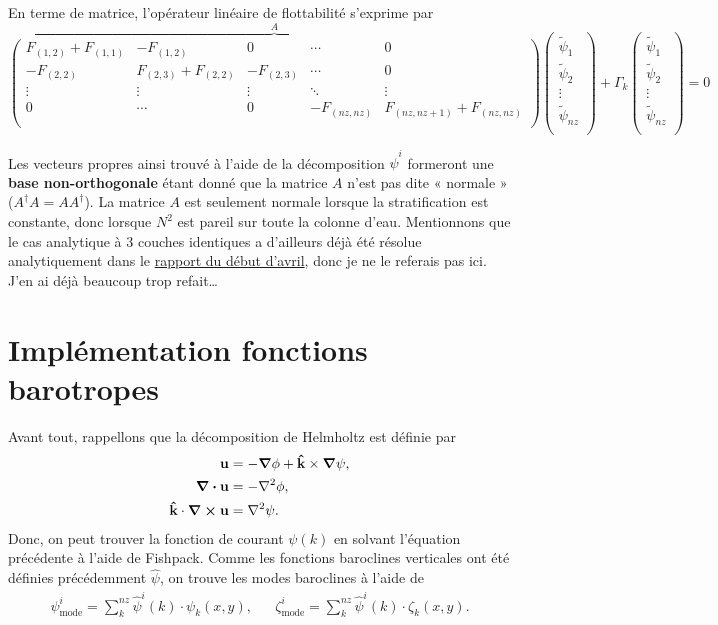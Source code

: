 \documentclass[10pt]{article}
\numberwithin{equation}{section}
\newcommand{\kvf}{\vb{\hat{k}}}
\newcommand{\uu}{\vb{u}}
\newcommand{\tpsi}{\tilde{\psi}}
\begin{document}
En terme de matrice, l'opérateur linéaire de flottabilité s'exprime par
\begin{equation}
\overbrace{
\begin{pmatrix}
   F_{(1,2)} + F_{(1,1)} & -F_{(1,2)}           & 0           & \cdots   &  0 \\
   -F_{(2,2)}           & F_{(2,3)} + F_{(2,2)} & -F_{(2,3)}   & \cdots   &   0 \\
   \vdots             & \vdots             & \vdots      & \ddots   &  \vdots \\
   0                  & \cdots             & 0           & -F_{(nz,nz)} & F_{(nz,nz+1)} + F_{(nz,nz)} \\
\end{pmatrix}}^A
\begin{pmatrix}
   \tpsi_1    \\
   \tpsi_2    \\
   \vdots     \\
   \tpsi_{nz} \\
\end{pmatrix}
+ \Gamma_k
\begin{pmatrix}
  \tpsi_1    \\
  \tpsi_2    \\
  \vdots     \\
  \tpsi_{nz} \\
\end{pmatrix} = 0
\end{equation}

Les vecteurs propres ainsi trouvé à l'aide de la décomposition \(\hat{\psi}^i\) formeront une \textbf{base non-orthogonale} étant donné que la matrice \(A\) n'est pas dite « normale » (\(A^\dagger A = A A^\dagger\)).
La matrice \(A\) est seulement normale lorsque la stratification est constante, donc lorsque
\(N^2\) est pareil sur toute la colonne d'eau.
Mentionnons que le cas analytique à 3 couches identiques a d'ailleurs déjà été résolue analytiquement dans le \href{rapport-2023-04-07.pdf}{rapport du début d'avril}, donc je ne le referais pas ici.
J'en ai déjà beaucoup trop refait\ldots{}
\section{Implémentation fonctions barotropes}
\label{sec:org3b173a4}
Avant tout, rappellons que la décomposition de Helmholtz est définie par
\begin{subequations}
\begin{align}
   \uu &= -\gradient{\phi} + \kvf \times \gradient{\psi},\\
   \divergence{\uu} &= -\laplacian{\phi},\\
   \kvf\cdot\curl{\uu} &= \laplacian{\psi}.
\end{align}
\end{subequations}
Donc, on peut trouver la fonction de courant \(\psi(k)\) en solvant l'équation précédente à l'aide de Fishpack.
Comme les fonctions baroclines verticales ont été définies précédemment \(\hat{\psi}\), on trouve les modes baroclines à l'aide de
\begin{align}
   &&\psi_\text{mode}^i = \sum_k^{nz} \hat{\psi}^i(k)\cdot  \psi_k(x,y),
   &&\zeta_\text{mode}^i = \sum_k^{nz} \hat{\psi}^i(k)\cdot  \zeta_k(x,y).&&
\end{align}
\end{document}
